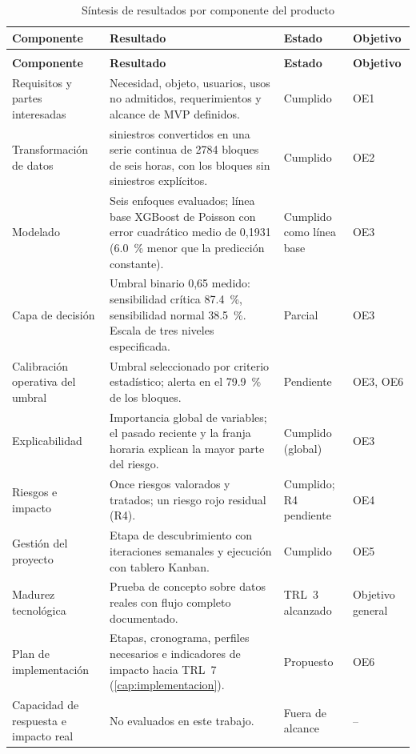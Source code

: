 {\small
\begin{longtable}{@{}>{\raggedright\arraybackslash}p{}
                    >{\raggedright\arraybackslash}p{}
                    >{\raggedright\arraybackslash}p{}
                    >{\raggedright\arraybackslash}p{}@{}}
\caption{Síntesis de resultados por componente del producto}
\label{tab:res-sintesis} \\
\toprule
\textbf{Componente} & \textbf{Resultado} & \textbf{Estado} & \textbf{Objetivo} \\
\midrule
\endfirsthead
\multicolumn{4}{@{}l}{\footnotesize\textit{Tabla \ref{tab:res-sintesis} (continuación)}} \\
\toprule
\textbf{Componente} & \textbf{Resultado} & \textbf{Estado} & \textbf{Objetivo} \\
\midrule
\endhead
\bottomrule
\endfoot
Requisitos y partes interesadas & Necesidad, objeto, usuarios, usos no admitidos, requerimientos y alcance de MVP definidos. & Cumplido & OE1 \\
Transformación de datos & 4320 siniestros convertidos en una serie continua de 2784 bloques de seis horas, con los bloques sin siniestros explícitos. & Cumplido & OE2 \\
Modelado & Seis enfoques evaluados; línea base XGBoost de Poisson con error cuadrático medio de 0,1931 (\qty{6.0}{\percent} menor que la predicción constante). & Cumplido como línea base & OE3 \\
Capa de decisión & Umbral binario 0,65 medido: sensibilidad crítica \qty{87.4}{\percent}, sensibilidad normal \qty{38.5}{\percent}. Escala de tres niveles especificada. & Parcial & OE3 \\
Calibración operativa del umbral & Umbral seleccionado por criterio estadístico; alerta en el \qty{79.9}{\percent} de los bloques. & Pendiente & OE3, OE6 \\
Explicabilidad & Importancia global de variables; el pasado reciente y la franja horaria explican la mayor parte del riesgo. & Cumplido (global) & OE3 \\
Riesgos e impacto & Once riesgos valorados y tratados; un riesgo rojo residual (R4). & Cumplido; R4 pendiente & OE4 \\
Gestión del proyecto & Etapa de descubrimiento con iteraciones semanales y ejecución con tablero Kanban. & Cumplido & OE5 \\
Madurez tecnológica & Prueba de concepto sobre datos reales con flujo completo documentado. & TRL~3 alcanzado & Objetivo general \\
Plan de implementación & Etapas, cronograma, perfiles necesarios e indicadores de impacto hacia TRL~7 (\cref{cap:implementacion}). & Propuesto & OE6 \\
Capacidad de respuesta e impacto real & No evaluados en este trabajo. & Fuera de alcance & -- \\
\end{longtable}
}
